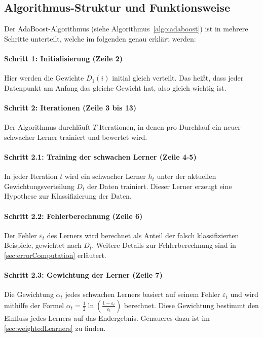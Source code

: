 \subsection{Algorithmus-Struktur und Funktionsweise}
Der AdaBoost-Algorithmus (siehe Algorithmus~\ref{algo:adaboost}) ist in mehrere Schritte unterteilt, welche im folgenden genau erklärt werden:

\paragraph{Schritt 1: Initialisierung (Zeile 2)}\label{para:Initialisierung}
\label{para:ada_algo_s1}
Hier werden die Gewichte \( D_1(i) \) initial gleich verteilt. Das heißt, dass jeder Datenpunkt am Anfang das gleiche Gewicht hat, also gleich wichtig ist.

\paragraph{Schritt 2: Iterationen (Zeile 3 bis 13)}
\label{para:ada_algo_s2}
Der Algorithmus durchläuft \( T \) Iterationen, in denen pro Durchlauf ein neuer schwacher Lerner trainiert und bewertet wird.

\paragraph{Schritt 2.1: Training der schwachen Lerner (Zeile 4-5)}
\label{para:ada_algo_s2.1}
In jeder Iteration \( t \) wird ein schwacher Lerner \( h_t \) unter der aktuellen Gewichtungsverteilung \( D_t \) der Daten trainiert. Dieser Lerner erzeugt eine Hypothese zur Klassifizierung der Daten.

\paragraph{Schritt 2.2: Fehlerberechnung (Zeile 6)}
\label{para:ada_algo_s2.2}
Der Fehler \( \varepsilon_t \) des Lerners wird berechnet als Anteil der falsch klassifizierten Beispiele, gewichtet nach \( D_t \). Weitere Details zur Fehlerberechnung sind in \autoref{sec:errorComputation} erläutert.

\paragraph{Schritt 2.3: Gewichtung der Lerner (Zeile 7)}
\label{para:ada_algo_s2.3}
Die Gewichtung \( \alpha_t \) jedes schwachen Lerners basiert auf seinem Fehler \( \varepsilon_t \) und wird mithilfe der Formel \( \alpha_t = \frac{1}{2} \ln\left(\frac{1 - \varepsilon_t}{\varepsilon_t}\right) \) berechnet. Diese Gewichtung bestimmt den Einfluss jedes Lerners auf das Endergebnis. Genaueres dazu ist im \autoref{sec:weightedLearners} zu finden.

